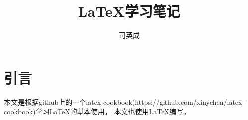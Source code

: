 \documentclass[a4papper, 12pt, utf8]{ctexbook}
\title{\LaTeX 学习笔记}
\author{司英成}
\begin{document}
\maketitle

\chapter*{引言}
本文是根据github上的一个latex-cookbook(https://github.com/xinychen/latex-cookbook)学习\LaTeX 的基本使用，
本文也使用\LaTeX 编写。
\end{document}
